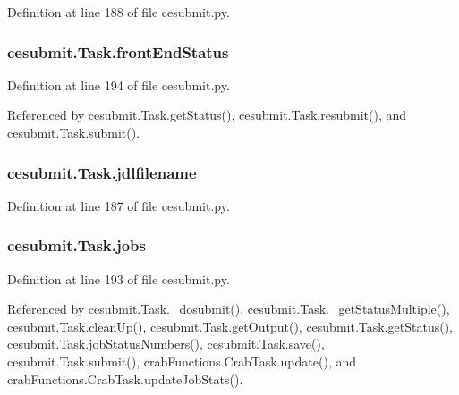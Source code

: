 Definition at line 188 of file cesubmit.\-py.

\subsubsection[{front\-End\-Status}]{\setlength{\rightskip}{0pt plus 5cm}cesubmit.\-Task.\-front\-End\-Status}\label{classcesubmit_1_1Task_a659e4563ce34de5c1e9d5203a2e6851f}


Definition at line 194 of file cesubmit.\-py.



Referenced by cesubmit.\-Task.\-get\-Status(), cesubmit.\-Task.\-resubmit(), and cesubmit.\-Task.\-submit().

\subsubsection[{jdlfilename}]{\setlength{\rightskip}{0pt plus 5cm}cesubmit.\-Task.\-jdlfilename}\label{classcesubmit_1_1Task_a7163d12ce0e40c4479b05288f6d53411}


Definition at line 187 of file cesubmit.\-py.

\subsubsection[{jobs}]{\setlength{\rightskip}{0pt plus 5cm}cesubmit.\-Task.\-jobs}\label{classcesubmit_1_1Task_acbe8ce4419b6f1b0106adc365b9b48a2}


Definition at line 193 of file cesubmit.\-py.



Referenced by cesubmit.\-Task.\-\_\-dosubmit(), cesubmit.\-Task.\-\_\-get\-Status\-Multiple(), cesubmit.\-Task.\-clean\-Up(), cesubmit.\-Task.\-get\-Output(), cesubmit.\-Task.\-get\-Status(), cesubmit.\-Task.\-job\-Status\-Numbers(), cesubmit.\-Task.\-save(), cesubmit.\-Task.\-submit(), crab\-Functions.\-Crab\-Task.\-update(), and crab\-Functions.\-Crab\-Task.\-update\-Job\-Stats().

